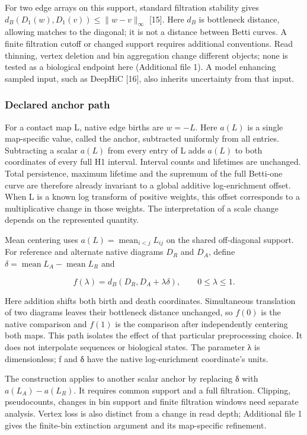 \documentclass[
  11pt,
]{article}
\newcounter{none} %
\begin{document}
For two edge arrays on this support, standard filtration stability gives
\(d_B(D_1(w),D_1(v))\leq\lVert w-v\rVert_\infty\) {[}15{]}. Here \(d_B\)
is bottleneck distance, allowing matches to the diagonal; it is not a
distance between Betti curves. A finite filtration cutoff or changed
support requires additional conventions. Read thinning, vertex deletion
and bin aggregation change different objects; none is tested as a
biological endpoint here (Additional file 1). A model enhancing sampled
input, such as DeepHiC {[}16{]}, also inherits uncertainty from that
input.

\subsubsection{Declared anchor path}\label{declared-anchor-path}

For a contact map L, native edge births are \(w=-L\). Here \(a(L)\) is a
single map-specific value, called the anchor, subtracted uniformly from
all entries. Subtracting a scalar \(a(L)\) from every entry of L adds
\(a(L)\) to both coordinates of every full H1 interval. Interval counts
and lifetimes are unchanged. Total persistence, maximum lifetime and the
supremum of the full Betti-one curve are therefore already invariant to
a global additive log-enrichment offset. When L is a known log transform
of positive weights, this offset corresponds to a multiplicative change
in those weights. The interpretation of a scale change depends on the
represented quantity.

Mean centering uses \(a(L)=\operatorname{mean}_{i<j}L_{ij}\) on the
shared off-diagonal support. For reference and alternate native diagrams
\(D_R\) and \(D_A\), define
\(\delta=\operatorname{mean}L_A-\operatorname{mean}L_R\) and

\[f(\lambda)=d_B(D_R,D_A+\lambda\delta),\qquad 0\leq\lambda\leq1.\]

Here addition shifts both birth and death coordinates. Simultaneous
translation of two diagrams leaves their bottleneck distance unchanged,
so \(f(0)\) is the native comparison and \(f(1)\) is the comparison
after independently centering both maps. This path isolates the effect
of that particular preprocessing choice. It does not interpolate
sequences or biological states. The parameter λ is dimensionless; f and
δ have the native log-enrichment coordinate's units.

The construction applies to another scalar anchor by replacing δ with
\(a(L_A)-a(L_R)\). It requires common support and a full filtration.
Clipping, pseudocounts, changes in bin support and finite filtration
windows need separate analysis. Vertex loss is also distinct from a
change in read depth; Additional file 1 gives the finite-bin extinction
argument and its map-specific refinement.
\end{document}
